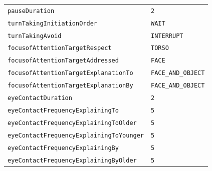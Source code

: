 \documentclass{CSSRforAfrica}
\begin{document}
\begin{table}[H]
\begin{tabular}{l l}
{\footnotesize \verb+pauseDuration+} 	                                            & {\footnotesize \verb+2+} \vspace{-1.5mm}   \\
{\footnotesize \verb+turnTakingInitiationOrder+}                             & {\footnotesize \verb+WAIT+} \vspace{-1.5mm} \\
{\footnotesize \verb+turnTakingAvoid+}                                           & {\footnotesize \verb+INTERRUPT+} \vspace{-1.5mm}  \\
{\footnotesize \verb+focusofAttentionTargetRespect+}                     & {\footnotesize \verb+TORSO+ } \vspace{-1.5mm}  \\
{\footnotesize \verb+focusofAttentionTargetAddressed+}                & {\footnotesize \verb+FACE+}  \vspace{-1.5mm} \\
{\footnotesize \verb+focusofAttentionTargetExplanationTo+}          & {\footnotesize \verb+FACE_AND_OBJECT+ }\vspace{-1.5mm} \\
{\footnotesize \verb+focusofAttentionTargetExplanationBy+}  	    & {\footnotesize \verb+FACE_AND_OBJECT+}\vspace{-1.5mm}   \\
{\footnotesize \verb+eyeContactDuration+}                                       & {\footnotesize \verb+2+}  \vspace{-1.5mm} \\
{\footnotesize \verb+eyeContactFrequencyExplainingTo+} 	             & {\footnotesize \verb+5+} \vspace{-1.5mm}  \\
{\footnotesize \verb+eyeContactFrequencyExplainingToOlder+} 	    & {\footnotesize \verb+5+} \vspace{-1.5mm} \\
{\footnotesize \verb+eyeContactFrequencyExplainingToYounger+}   & {\footnotesize \verb+5+} \vspace{-1.5mm} \\
{\footnotesize \verb+eyeContactFrequencyExplainingBy+} 	            & {\footnotesize \verb+5+} \vspace{-1.5mm} \\
{\footnotesize \verb+eyeContactFrequencyExplainingByOlder+} 	    & {\footnotesize \verb+5+} \vspace{-1.5mm} \\

\end{tabular}
\end{table}
\end{document}
